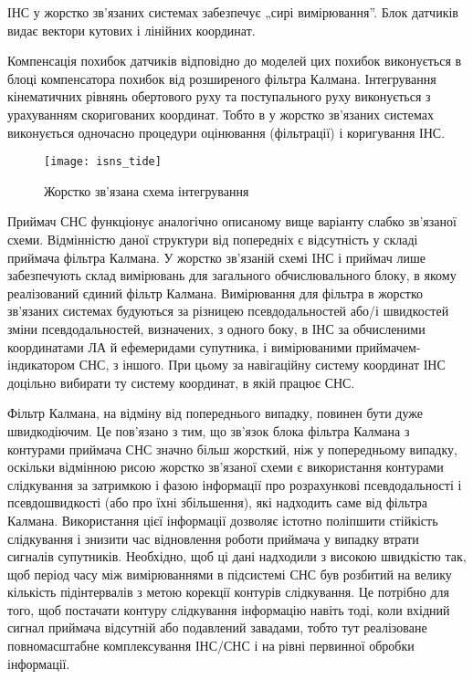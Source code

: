 ІНС у жорстко зв'язаних системах забезпечує „сирі вимірювання''. Блок датчиків видає 
вектори кутових  і лінійних координат.  

Компенсація похибок датчиків відповідно до моделей цих похибок виконується в блоці 
компенсатора похибок від розширеного фільтра Калмана. Інтегрування кінематичних рівнянь 
обертового руху та поступального руху виконується з урахуванням скоригованих координат. 
Тобто в у жорстко зв'язаних системах виконується одночасно процедури оцінювання (фільтрації) 
і коригування ІНС.
\begin{figure}[here]
\centering
\texttt{[image: isns\_tide]}
\caption{Жорстко зв'язана схема інтегрування}
\label{fig:isns_tide}
\end{figure}

Приймач СНС функціонує аналогічно описаному вище варіанту 
слабко зв'язаної схеми. Відмінністю даної структури від попередніх є відсутність 
у складі приймача фільтра Калмана. У жорстко зв'язаній схемі ІНС і приймач лише забезпечують 
склад вимірювань для загального обчислювального блоку, в якому реалізований єдиний 
фільтр Калмана. Вимірювання для фільтра в жорстко зв'язаних системах будуються за 
різницею псевдодальностей або/і швидкостей зміни псевдодальностей, визначених, з 
одного боку, в ІНС за обчисленими координатами ЛА й ефемеридами супутника, і вимірюваними 
приймачем-індикатором СНС, з іншого. При цьому за навігаційну систему координат ІНС 
доцільно вибирати ту систему координат, в якій працює СНС.  

Фільтр Калмана, на відміну від попереднього випадку, повинен бути дуже швидкодіючим. 
Це пов'язано з тим, що зв'язок блока фільтра Калмана з контурами приймача СНС значно 
більш жорсткий, ніж у попередньому випадку, оскільки відмінною рисою жорстко зв'язаної 
схеми є використання контурами слідкування за затримкою і фазою інформації про розрахункові 
псевдодальності і псевдошвидкості (або про їхні збільшення), які надходить саме від 
фільтра Калмана. Використання цієї інформації дозволяє істотно поліпшити стійкість 
слідкування і знизити час відновлення роботи приймача у випадку втрати сигналів супутників. 
Необхідно, щоб ці дані надходили з високою швидкістю так, щоб період часу між вимірюваннями 
в підсистемі СНС був розбитий на велику кількість підінтервалів  з метою корекції 
контурів слідкування. Це потрібно для того, щоб постачати контуру слідкування інформацію 
навіть тоді, коли вхідний сигнал приймача відсутній або подавлений завадами, тобто 
тут реалізоване повномасштабне комплексування ІНС/СНС і на рівні первинної обробки 
інформації.

